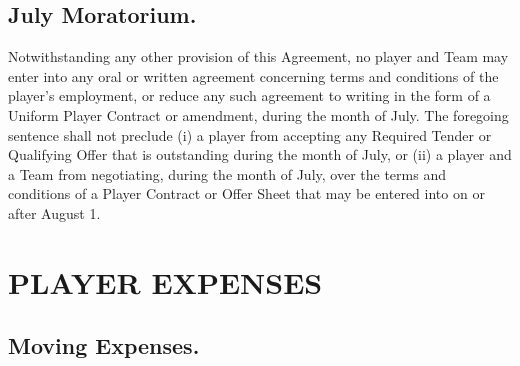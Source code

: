 \documentclass[
]{book}
\begin{document}
\hypertarget{july-moratorium.}{%
\section{July Moratorium.}\label{july-moratorium.}}

Notwithstanding any other provision of this Agreement, no player and Team may enter into any oral or written agreement concerning terms and conditions of the player's employment, or reduce any such agreement to writing in the form of a Uniform Player Contract or amendment, during the month of July. The foregoing sentence shall not preclude (i) a player from accepting any Required Tender or Qualifying Offer that is outstanding during the month of July, or (ii) a player and a Team from negotiating, during the month of July, over the terms and conditions of a Player Contract or Offer Sheet that may be entered into on or after August 1.

\hypertarget{player-expenses}{%
\chapter{PLAYER EXPENSES}\label{player-expenses}}

\hypertarget{moving-expenses.}{%
\section{Moving Expenses.}\label{moving-expenses.}}
\end{document}
